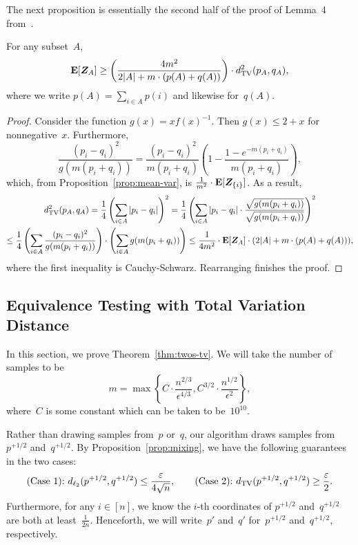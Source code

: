 The next proposition is essentially the second half of the proof of Lemma~$4$ from~\cite{ChanDVV14}.

\begin{proposition}\label{prop:their-bound}
For any subset~$A$,
\begin{equation*}
\mbox{\bf E}[\boldsymbol{Z}_A] \geq \left(\frac{4m^2}{2|A| + m\cdot(p(A) + q(A))}\right)\cdot d_{\mathrm {TV}}^2(p_A,q_A),
\end{equation*}
where we write $p(A) = \sum_{i \in A} p(i)$ and likewise for~$q(A)$.
\end{proposition}
\begin{proof}
Consider the function $g(x) = x f(x)^{-1}$.
Then $g(x) \leq 2+x$ for nonnegative~$x$.
Furthermore,
\begin{equation*}
\frac{(p_i - q_i)^2}{g(m(p_i + q_i))} = \frac{(p_i-q_i)^2}{m(p_i+q_i)} \left(1 - \frac{1-e^{-m(p_i+q_i)}}{m(p_i + q_i)}\right),
\end{equation*}
which, from Proposition~\ref{prop:mean-var}, is $\frac{1}{m^2} \cdot \mbox{\bf E}[\boldsymbol{Z}_{\{i\}}]$.
As a result,
\begin{multline*}
d_{\mathrm {TV}}^2(p_A,q_A)
= \frac14 \left(\sum_{i \in A} |p_i - q_i|\right)^2
= \frac14 \left(\sum_{i \in A} |p_i - q_i|\cdot \frac{\sqrt{g(m(p_i+q_i))}}{\sqrt{g(m(p_i+q_i))}}\right)^2\\
\leq \frac14\left(\sum_{i \in A} \frac{(p_i - q_i)^2}{g(m(p_i + q_i))}\right) \cdot \left(\sum_{i \in A} g(m(p_i + q_i))\right)
\leq \frac{1}{4m^2} \cdot \mbox{\bf E}[\boldsymbol{Z}_A] \cdot(2|A| + m\cdot (p(A) + q(A))),
\end{multline*}
where the first inequality is Cauchy-Schwarz. Rearranging finishes the proof.
\end{proof}


\subsection{Equivalence Testing with Total Variation Distance}
\label{sec:eq-tv}
In this section, we prove Theorem~\ref{thm:twos-tv}. 
We will take the number of samples to be 
\begin{equation}\label{eq:l1-max}
m = \max\left\{C\cdot \frac{n^{2/3}}{\epsilon^{4/3}}, C^{3/2}\cdot \frac{n^{1/2}}{\epsilon^2}\right\},
\end{equation}
where~$C$ is some constant which can be taken to be~$10^{10}$.
 
Rather than drawing samples from~$p$ or~$q$,
our algorithm draws samples from~$p^{+1/2}$ and~$q^{+1/2}$.
By Proposition~\ref{prop:mixing}, we have the following guarantees in the two cases:
\begin{equation*}
\text{(Case 1):}~d_{\ell_2}(p^{+1/2},q^{+1/2}) \leq \frac{\varepsilon}{4 \sqrt{n}},
\qquad
\text{(Case 2):}~d_{\mathrm {TV}}(p^{+1/2},q^{+1/2}) \geq \frac{\varepsilon}{2}.
\end{equation*}
Furthermore, for any $i \in [n]$, we know the $i$-th coordinates of $p^{+1/2}$ and~$q^{+1/2}$ are both at least~$\frac{1}{2n}$.
Henceforth, we will write~$p'$ and~$q'$ for~$p^{+1/2}$ and~$q^{+1/2}$, respectively.

